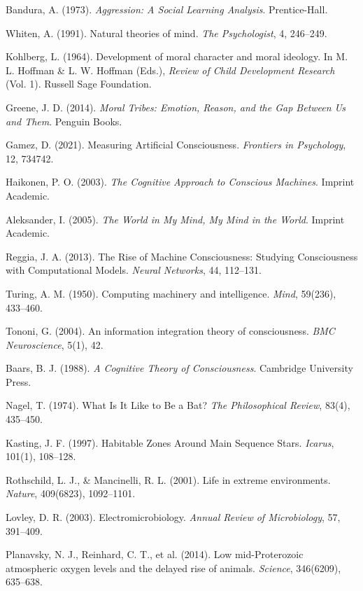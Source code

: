 \documentclass[12pt]{article}
\begin{document}
\begin{thebibliography}{999}
Bandura, A. (1973).
\textit{Aggression: A Social Learning Analysis}.
Prentice-Hall.

Whiten, A. (1991).
Natural theories of mind.
\textit{The Psychologist}, 4, 246--249.

Kohlberg, L. (1964).
Development of moral character and moral ideology.
In M. L. Hoffman \& L. W. Hoffman (Eds.),
\textit{Review of Child Development Research} (Vol. 1).
Russell Sage Foundation.

Greene, J. D. (2014).
\textit{Moral Tribes: Emotion, Reason, and the Gap Between Us and Them}.
Penguin Books.

Gamez, D. (2021).
Measuring Artificial Consciousness.
\textit{Frontiers in Psychology}, 12, 734742.

Haikonen, P. O. (2003).
\textit{The Cognitive Approach to Conscious Machines}.
Imprint Academic.

Aleksander, I. (2005).
\textit{The World in My Mind, My Mind in the World}.
Imprint Academic.

Reggia, J. A. (2013).
The Rise of Machine Consciousness: Studying Consciousness with Computational Models.
\textit{Neural Networks}, 44, 112--131.


Turing, A. M. (1950).
Computing machinery and intelligence.
\textit{Mind}, 59(236), 433--460.

Tononi, G. (2004).
An information integration theory of consciousness.
\textit{BMC Neuroscience}, 5(1), 42.

Baars, B. J. (1988).
\textit{A Cognitive Theory of Consciousness}.
Cambridge University Press.

Nagel, T. (1974).
What Is It Like to Be a Bat?
\textit{The Philosophical Review}, 83(4), 435--450.

Kasting, J. F. (1997).
Habitable Zones Around Main Sequence Stars.
\textit{Icarus}, 101(1), 108--128.

Rothschild, L. J., \& Mancinelli, R. L. (2001).
Life in extreme environments.
\textit{Nature}, 409(6823), 1092--1101.

Lovley, D. R. (2003).
Electromicrobiology.
\textit{Annual Review of Microbiology}, 57, 391--409.

Planavsky, N. J., Reinhard, C. T., et al. (2014).
Low mid-Proterozoic atmospheric oxygen levels and the delayed rise of animals.
\textit{Science}, 346(6209), 635--638.


\end{thebibliography}
\end{document}
